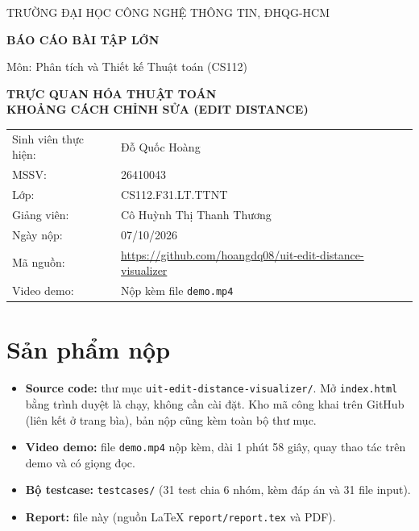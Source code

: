 \documentclass[12pt,a4paper]{article}
\newcommand{\code}[1]{\texttt{#1}}
\begin{document}
\begin{titlepage}
\centering
{\large TRƯỜNG ĐẠI HỌC CÔNG NGHỆ THÔNG TIN, ĐHQG-HCM\par}
\vspace{1.2cm}
{\Large\bfseries BÁO CÁO BÀI TẬP LỚN\par}
{\large Môn: Phân tích và Thiết kế Thuật toán (CS112)\par}
\vspace{1.5cm}
{\LARGE\bfseries TRỰC QUAN HÓA THUẬT TOÁN\\KHOẢNG CÁCH CHỈNH SỬA (EDIT DISTANCE)\par}
\vspace{1.5cm}
\begin{tabular}{ll}
Sinh viên thực hiện: & Đỗ Quốc Hoàng\\
MSSV: & 26410043\\
Lớp: & CS112.F31.LT.TTNT\\
Giảng viên: & Cô Huỳnh Thị Thanh Thương\\
Ngày nộp: & 07/10/2026\\
Mã nguồn: & \url{https://github.com/hoangdq08/uit-edit-distance-visualizer}\\
Video demo: & Nộp kèm file \code{demo.mp4}\\
\end{tabular}
\end{titlepage}

\tableofcontents
\newpage

\section{Sản phẩm nộp}
\begin{itemize}[nosep]
  \item \textbf{Source code:} thư mục \code{uit-edit-distance-visualizer/}. Mở \code{index.html} bằng trình duyệt là chạy, không cần cài đặt. Kho mã công khai trên GitHub (liên kết ở trang bìa), bản nộp cũng kèm toàn bộ thư mục.
  \item \textbf{Video demo:} file \code{demo.mp4} nộp kèm, dài 1 phút 58 giây, quay thao tác trên demo và có giọng đọc.
  \item \textbf{Bộ testcase:} \code{testcases/} (31 test chia 6 nhóm, kèm đáp án và 31 file input).
  \item \textbf{Report:} file này (nguồn LaTeX \code{report/report.tex} và PDF).
\end{itemize}
\end{document}
